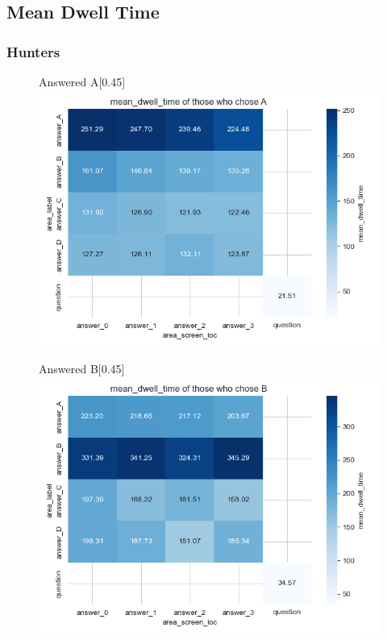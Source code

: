 \documentclass{article}
\begin{document}
\subsection{Mean Dwell Time}
\subsubsection{Hunters}

\begin{figure}[H]
  \centering
  \begin{subcaptionbox}{Answered A\label{fig:A_dt_h}}[0.45\textwidth]
    {\centering\includegraphics[width=\linewidth]{plots/matrix_plots/matrix_mean_dwell_time_A_hunters.png}}
  \end{subcaptionbox}
  \hfill
  \begin{subcaptionbox}{Answered B\label{fig:B_dt_h}}[0.45\textwidth]
    {\centering\includegraphics[width=\linewidth]{plots/matrix_plots/matrix_mean_dwell_time_B_hunters.png}}
  \end{subcaptionbox}
  

\end{figure}
\end{document}
